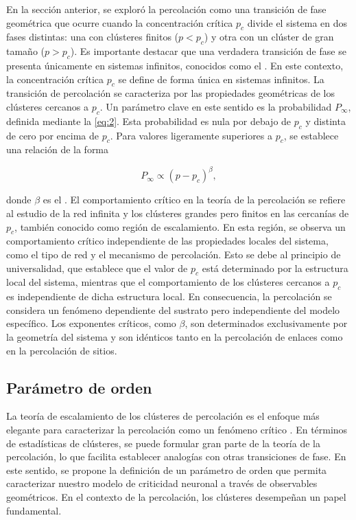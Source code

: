 En la sección anterior, se exploró la percolación como una transición de fase geométrica  que ocurre cuando la concentración crítica $p_c$ divide el sistema en dos fases distintas: una con clústeres finitos ($p < p_c$) y otra con un clúster de gran tamaño ($p > p_c$). Es importante destacar que una verdadera transición de fase se presenta únicamente en sistemas infinitos, conocidos como el . En este contexto, la concentración crítica $p_c$ se define de forma única en sistemas infinitos. La transición de percolación se caracteriza por las propiedades geométricas de los clústeres cercanos a $p_c$. Un parámetro clave en este sentido es la probabilidad $P_\infty$, definida mediante la  \cref{eq:2}. Esta probabilidad es nula por debajo de $p_c$ y distinta de cero por encima de $p_c$. Para valores ligeramente superiores a $p_c$, se establece una relación de la forma

 \begin{equation}\label{eq:10}
	P_\infty \propto \left(p-p_c\right)^\beta,
\end{equation}

donde $\beta$ es el . El comportamiento crítico en la teoría de la percolación se refiere al estudio de la red infinita y los clústeres grandes pero finitos en las cercanías de $p_c$, también conocido como región de escalamiento. En esta región, se observa un comportamiento crítico independiente de las propiedades locales del sistema, como el tipo de red y el mecanismo de percolación. Esto se debe al principio de universalidad, que establece que el valor de $p_c$ está determinado por la estructura local del sistema, mientras que el comportamiento de los clústeres cercanos a $p_c$ es independiente de dicha estructura local. En consecuencia, la percolación se considera un fenómeno dependiente del sustrato pero independiente del modelo específico. Los exponentes críticos, como $\beta$, son determinados exclusivamente por la geometría del sistema y son idénticos tanto en la percolación de enlaces como en la percolación de sitios.

 \subsection{Parámetro de orden}\label{sec:parametro_orden}
 
 
 
 
 
La teoría de escalamiento de los clústeres de percolación es el enfoque más elegante para caracterizar la percolación como un fenómeno crítico \cite{stauffer_scaling_1979}. En términos de estadísticas de clústeres, se puede formular gran parte de la teoría de la percolación, lo que facilita establecer analogías con otras transiciones de fase. En este sentido, se propone la definición de un parámetro de orden que permita caracterizar nuestro modelo de criticidad neuronal a través de observables geométricos. En el contexto de la percolación, los clústeres desempeñan un papel fundamental.
 
